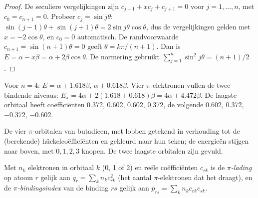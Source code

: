 \begin{proof}
De seculiere vergelijkingen zijn $c_{j-1} + xc_j + c_{j+1} = 0$ voor $j = 1, \dots, n$, met
$c_0 = c_{n+1} = 0$. Probeer $c_j = \sin j\theta$: $\sin(j - 1)\theta + \sin(j + 1)\theta = 2\sin
j\theta\cos\theta$, dus de vergelijkingen gelden met $x = -2\cos\theta$, en $c_0 = 0$
automatisch. De randvoorwaarde $c_{n+1} = \sin(n + 1)\theta = 0$ geeft $\theta =
k\pi/(n + 1)$. Dan is $E = \alpha - x\beta = \alpha + 2\beta\cos\theta$. De normering gebruikt
$\sum_{j=1}^n\sin^2 j\theta = (n + 1)/2$.
\end{proof}

\begin{example}[Butadieen]\label{ex:b2:huckel:butadiene}
Voor $n = 4$: $E = \alpha \pm 1.618\beta$, $\alpha \pm 0.618\beta$. Vier $\pi$-elektronen vullen de twee
bindende niveaus: $E_\pi = 4\alpha + 2(1.618 + 0.618)\beta = 4\alpha + 4.472\beta$. De laagste
orbitaal heeft coëfficiënten 0.372, 0.602, 0.602, 0.372, de volgende 0.602, 0.372,
$-0.372$, $-0.602$.
\end{example}

\begin{omfigure}

{\small De vier $\pi$-orbitalen van butadieen, met lobben getekend in verhouding tot de
(berekende) hückelcoëfficiënten en gekleurd naar hun teken; de energieën stijgen
naar boven, met $0, 1, 2, 3$ knopen. De twee laagste orbitalen zijn gevuld.}
\end{omfigure}

\begin{definition}\label{def:b2:huckel:indices}
Met $n_k$ elektronen in orbitaal $k$ (0, 1 of 2) en reële coëfficiënten $c_{rk}$ is de
\emph{$\pi$-lading} op atoom $r$ gelijk aan $q_r = \sum_k n_kc_{rk}^2$ (het
aantal $\pi$-elektronen dat het draagt), en de \emph{$\pi$-bindingsindex}
van de binding $rs$ gelijk aan $p_{rs} = \sum_k n_kc_{rk}c_{sk}$.
\end{definition}


